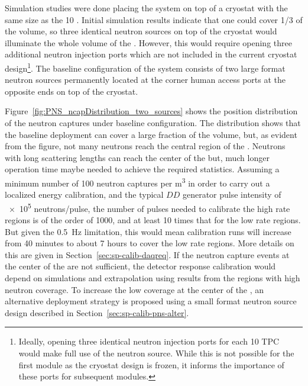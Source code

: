 Simulation studies were done placing the  system on top of a cryostat with the same size as the  \SI{10}{\kton} . Initial simulation results indicate that one  could cover 1/3 of the  volume, so three identical neutron sources on top of the cryostat would illuminate the whole  volume of the  . However, this would require opening three additional neutron injection ports which are not included in the current cryostat design\footnote{Ideally, opening three identical neutron injection ports for each \SI{10}{\kton} TPC would make full use of the neutron source. While this is not possible for the first  module as the cryostat design is frozen, it informs the importance of these ports for subsequent  modules.}. The baseline configuration of the  system consists of two large format neutron sources permanently located at the corner human access ports at the opposite ends on top of the cryostat. 

Figure~\ref{fig:PNS_ncapDistribution_two_sources} shows the position distribution of the neutron captures under baseline configuration. The distribution shows that the baseline deployment can cover a large fraction of the  volume, but, as evident from the figure, not many neutrons reach the central region of the . Neutrons with long scattering lengths can reach the center of the  but, much longer operation time maybe needed to achieve the required statistics. Assuming a minimum number of \num{100} neutron captures per \si{\cubic\m} in order to carry out a localized energy calibration, and the typical $DD$ generator pulse intensity of \num{e5} neutrons/pulse, the number of pulses needed to calibrate the high rate regions is of the order of \num{1000}, and at least \num{10} times that for the low rate regions. But given the \SI{0.5}{\hertz}  limitation, this would mean calibration runs will increase from 40 minutes to about \num{7} hours to cover the low rate regions. More details on this are given in Section~\ref{sec:sp-calib-daqreq}.
If the neutron capture events at the center of the  are not sufficient, the detector response calibration would depend on simulations and extrapolation using results from the regions with high neutron coverage. To increase the low coverage at the center of the , an alternative deployment strategy is proposed using a small format neutron source design described in Section~\ref{sec:sp-calib-pns-alter}. 

